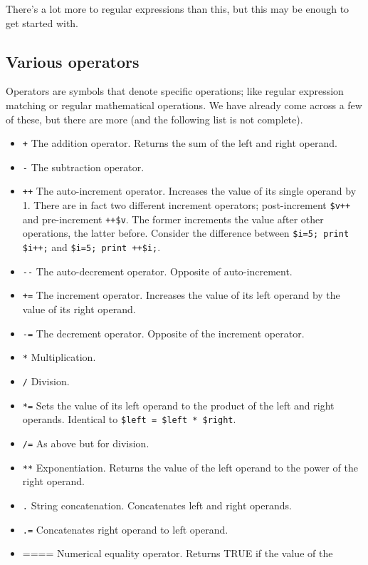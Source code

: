 \documentclass[11pt]{article}
\begin{document}
There's a lot more to regular expressions than this, but this may be enough to get
started with.
\subsection{Various operators}
\label{sec-5-7}


Operators are symbols that denote specific operations; like regular
expression matching or regular mathematical operations. We have already
come across a few of these, but there are more (and the following list
is not complete).

\begin{itemize}
\item \texttt{+} The addition operator. Returns the sum of the left and right
  operand.
\item \texttt{-} The subtraction operator.
\item \texttt{++} The auto-increment operator. Increases the value of its single
  operand by 1. There are in fact two different increment operators;
  post-increment \texttt{\$v++} and pre-increment \texttt{++\$v}. The former increments
  the value after other operations, the latter before. Consider the
  difference between \texttt{\$i=5; print \$i++;} and \texttt{\$i=5; print ++\$i;}.
\item \texttt{-{}-} The auto-decrement operator. Opposite of auto-increment.
\item \texttt{+=} The increment operator. Increases the value of its left operand
  by the value of its right operand.
\item \texttt{-=} The decrement operator. Opposite of the increment operator.
\item \texttt{*} Multiplication.
\item \texttt{/} Division.
\item \texttt{*=} Sets the value of its left operand to the product of the left
  and right operands. Identical to \texttt{\$left = \$left * \$right}.
\item \texttt{/=} As above but for division.
\item \texttt{**} Exponentiation. Returns the value of the left operand to the
  power of the right operand.
\item \texttt{.} String concatenation. Concatenates left and right operands.
\item \texttt{.=} Concatenates right operand to left operand.
\item ==== Numerical equality operator. Returns TRUE if the value of the

\end{itemize}
\end{document}
